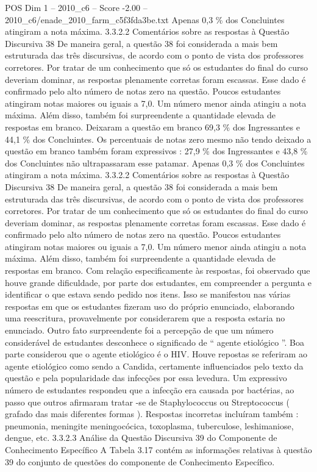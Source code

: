 \begin{textsample}{POS Dim 1 – 2010\_c6 – Score -2.00 – 2010\_c6/enade\_2010\_farm\_c5f3fda3be.txt}
Apenas 0,3 \% dos Concluintes atingiram a nota máxima. 3.3.2.2 Comentários sobre as respostas à Questão Discursiva 38 De maneira geral, a questão 38 foi considerada a mais bem estruturada das três discursivas, de acordo com o ponto de vista dos professores corretores.
Por tratar de um conhecimento que só os estudantes do final do curso deveriam dominar, as respostas plenamente corretas foram escassas.
Esse dado é confirmado pelo alto número de notas zero na questão.
Poucos estudantes atingiram notas maiores ou iguais a 7,0.
Um número menor ainda atingiu a nota máxima.
Além disso, também foi surpreendente a quantidade elevada de respostas em branco.
Deixaram a questão em branco 69,3 \% dos Ingressantes e 44,1 \% dos Concluintes.
Os percentuais de notas zero mesmo não tendo deixado a questão em branco também foram expressivos : 27,9 \% dos Ingressantes e 43,8 \% dos Concluintes não ultrapassaram esse patamar.
Apenas 0,3 \% dos Concluintes atingiram a nota máxima. 3.3.2.2 Comentários sobre as respostas à Questão Discursiva 38 De maneira geral, a questão 38 foi considerada a mais bem estruturada das três discursivas, de acordo com o ponto de vista dos professores corretores.
Por tratar de um conhecimento que só os estudantes do final do curso deveriam dominar, as respostas plenamente corretas foram escassas.
Esse dado é confirmado pelo alto número de notas zero na questão.
Poucos estudantes atingiram notas maiores ou iguais a 7,0.
Um número menor ainda atingiu a nota máxima.
Além disso, também foi surpreendente a quantidade elevada de respostas em branco.
Com relação especificamente às respostas, foi observado que houve grande dificuldade, por parte dos estudantes, em compreender a pergunta e identificar o que estava sendo pedido nos itens.
Isso se manifestou nas várias respostas em que os estudantes fizeram uso do próprio enunciado, elaborando uma reescritura, provavelmente por considerarem que a resposta estaria no enunciado.
Outro fato surpreendente foi a percepção de que um número considerável de estudantes desconhece o significado de “ agente etiológico ”.
Boa parte considerou que o agente etiológico é o HIV.
Houve repostas se referiram ao agente etiológico como sendo a Candida, certamente influenciados pelo texto da questão e pela popularidade das infecções por essa levedura.
Um expressivo número de estudantes respondeu que a infecção era causada por bactérias, ao passo que outros afirmaram tratar -se de Staphylococcus ou Streptococcus ( grafado das mais diferentes formas ).
Respostas incorretas incluíram também : pneumonia, meningite meningocócica, toxoplasma, tuberculose, leshimaniose, dengue, etc. 3.3.2.3 Análise da Questão Discursiva 39 do Componente de Conhecimento Específico A Tabela 3.17 contém as informações relativas à questão 39 do conjunto de questões do componente de Conhecimento Específico.

\end{textsample}

